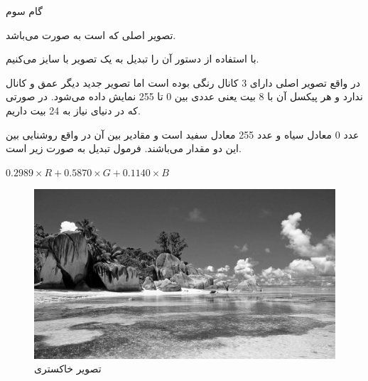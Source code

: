 \Problem
{گام سوم}
{
    تصویر اصلی که 
    است به صورت 
    می‌باشد.
    
    با استفاده از دستور 
    آن را تبدیل به یک تصویر 
    با سایز 
    می‌کنیم.
    
    در واقع تصویر اصلی دارای 3 کانال رنگی بوده است اما تصویر جدید دیگر عمق و کانال ندارد و هر پیکسل آن با 8 بیت یعنی عددی بین 0 تا 255 نمایش داده می‌شود. در صورتی که در دنیای 
     نیاز به 24 بیت داریم.
    
    عدد 0 معادل سیاه و عدد 255 معادل سفید است و مقادیر بین آن در واقع روشنایی بین این دو مقدار می‌باشند. فرمول تبدیل به صورت زیر است.
    
    \begin{center}
        $0.2989 \times R + 0.5870 \times G + 0.1140 \times B$
    \end{center}
    
    \begin{figure}[H]
        \includegraphics[width=15cm]{Images/Gray.jpg}
        \centering
        \caption{تصویر خاکستری}
    \end{figure}
    
    
}
